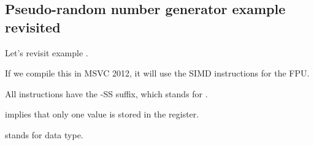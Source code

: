 \subsection{Pseudo-random number generator example revisited}
\label{FPU_PRNG_SIMD}

Let's revisit  example .

If we compile this in MSVC 2012, it will use the SIMD instructions for the FPU.




All instructions have the -SS suffix, which stands for .

 implies that only one value is stored in the register.

 stands for \Tfloat data type.

